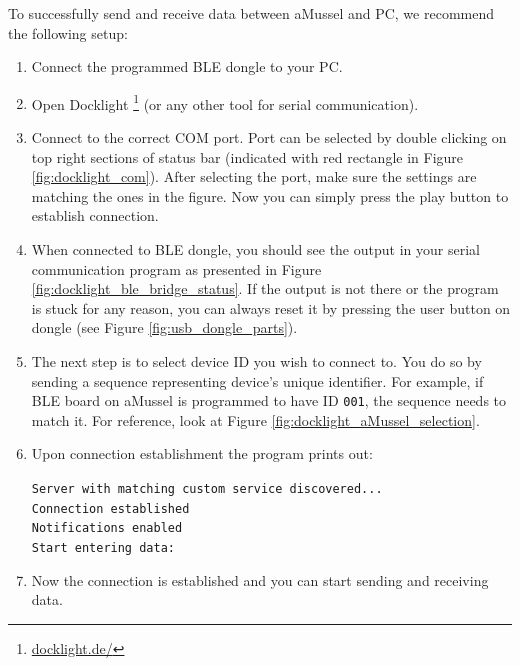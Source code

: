 To successfully send and receive data between aMussel and PC, we recommend the following setup:
\begin{enumerate}
	\item Connect the programmed BLE dongle to your PC.
	\item Open Docklight \footnote{\url{docklight.de/}} (or any other tool for serial communication).
	\item Connect to the correct COM port. Port can be selected by double clicking on top right sections of status bar (indicated with red rectangle in Figure \ref{fig:docklight_com}). After selecting the port, make sure the settings are matching the ones in the figure. Now you can simply press the play button to establish connection.
	\item When connected to BLE dongle, you should see the output in your serial communication program as presented in Figure \ref{fig:docklight_ble_bridge_status}. If the output is not there or the program is stuck for any reason, you can always reset it by pressing the user button on dongle (see Figure \ref{fig:usb_dongle_parts}).
	\item The next step is to select device ID you wish to connect to. You do so by sending a sequence representing device's unique identifier. For example, if BLE board on aMussel is programmed to have ID \texttt{001}, the sequence needs to match it. For reference, look at Figure \ref{fig:docklight_aMussel_selection}.
	\item Upon connection establishment the program prints out: \\
	\hspace{10pt}\parbox[t]{\linewidth}{\texttt{Server with matching custom service discovered... \\
		Connection established \\
		Notifications enabled \\
		Start entering data:
	}}
	\item Now the connection is established and you can start sending and receiving data.
\end{enumerate}
